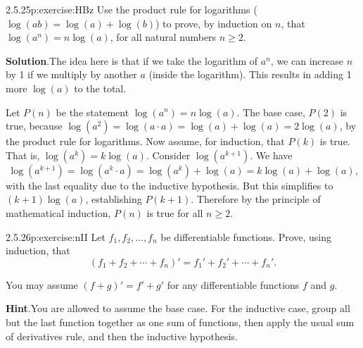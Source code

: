 \documentclass[twoside,11pt,]{book}
\newcommand{\blocktitlefont}{\relax}
\numberwithin{equation}{chapter}
\begin{document}
\begin{divisionsolution}{2.5.25}{}{p:exercise:HBz}%
Use the product rule for logarithms (\(\log(ab) = \log(a) + \log(b)\)) to prove, by induction on \(n\), that \(\log(a^n) = n \log(a)\), for all natural numbers \(n \ge 2\).%
\par\smallskip%
\noindent\textbf{\blocktitlefont Solution}.\quad{}The idea here is that if we take the logarithm of \(a^n\), we can increase \(n\) by 1 if we multiply by another \(a\) (inside the logarithm). This results in adding 1 more \(\log(a)\) to the total.%
\begin{solutionproof}
Let \(P(n)\) be the statement \(\log(a^n) = n \log(a)\). The base case, \(P(2)\) is true, because \(\log(a^2) = \log(a\cdot a) = \log(a) + \log(a) = 2\log(a)\), by the product rule for logarithms. Now assume, for induction, that \(P(k)\) is true. That is, \(\log(a^k) = k\log(a)\). Consider \(\log(a^{k+1})\). We have%
\begin{equation*}
\log(a^{k+1}) = \log(a^k\cdot a) = \log(a^k) + \log(a) = k\log(a) + \log(a)\text{,}
\end{equation*}
with the last equality due to the inductive hypothesis. But this simplifies to \((k+1) \log(a)\), establishing \(P(k+1)\). Therefore by the principle of mathematical induction, \(P(n)\) is true for all \(n \ge 2\).%
\end{solutionproof}
\end{divisionsolution}%
\begin{divisionsolution}{2.5.26}{}{p:exercise:nII}%
Let \(f_1, f_2,\ldots, f_n\) be differentiable functions. Prove, using induction, that%
\begin{equation*}
(f_1 + f_2 + \cdots + f_n)' = f_1' + f_2' + \cdots + f_n'\text{.}
\end{equation*}
%
\par
You may assume \((f+g)' = f' + g'\) for any differentiable functions \(f\) and \(g\).%
\par\smallskip%
\noindent\textbf{\blocktitlefont Hint}.\quad{}You are allowed to assume the base case. For the inductive case, group all but the last function together as one sum of functions, then apply the usual sum of derivatives rule, and then the inductive hypothesis.%
\end{divisionsolution}%
\end{document}
